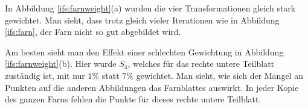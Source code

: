 In Abbildung \ref{ifs:farnweight}(a) wurden die vier Transformationen gleich stark gewichtet.
Man sieht, dass trotz gleich vieler Iterationen wie in Abbildung \ref{ifs:farn}, der Farn nicht so gut abgebildet wird.

Am besten sieht man den Effekt einer schlechten Gewichtung in Abbildung \ref{ifs:farnweight}(b).
Hier wurde $S_4$, welches für das rechte untere Teilblatt zuständig ist, mit nur $1\%$ statt $7\%$ gewichtet.
Man sieht, wie sich der Mangel an Punkten auf die anderen Abbildungen das Farnblattes auswirkt.
In jeder Kopie des ganzen Farns fehlen die Punkte für dieses rechte untere Teilblatt.

